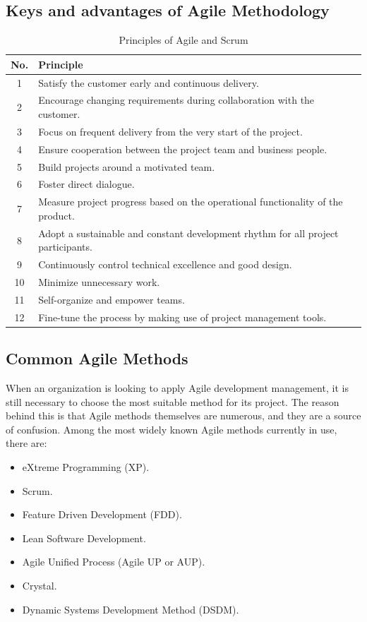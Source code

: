 \subsection{Keys and advantages of Agile Methodology}
\begin{table}[h]
\centering
\begin{tabular}{|c|l|}
\hline
\textbf{No.} & \textbf{Principle} \\ \hline
1  & Satisfy the customer early and continuous delivery. \\ \hline
2  & Encourage changing requirements during collaboration with the customer. \\ \hline
3  & Focus on frequent delivery from the very start of the project. \\ \hline
4  & Ensure cooperation between the project team and business people. \\ \hline
5  & Build projects around a motivated team. \\ \hline
6  & Foster direct dialogue. \\ \hline
7  & Measure project progress based on the operational functionality of the product. \\ \hline
8  & Adopt a sustainable and constant development rhythm for all project participants. \\ \hline
9  & Continuously control technical excellence and good design. \\ \hline
10 & Minimize unnecessary work. \\ \hline
11 & Self-organize and empower teams. \\ \hline
12 & Fine-tune the process by making use of project management tools. \\ \hline
\end{tabular}
\caption{Principles of Agile and Scrum}
\end{table}

\subsection{Common Agile Methods}
When an organization is looking to apply Agile development management, it is still necessary to choose the most suitable method for its project. The reason behind this is that Agile methods themselves are numerous, and they are a source of confusion. Among the most widely known Agile methods currently in use, there are:
\begin{itemize}
    \item eXtreme Programming (XP).
    \item Scrum.
    \item Feature Driven Development (FDD).
    \item Lean Software Development.
    \item Agile Unified Process (Agile UP or AUP).
    \item Crystal.
    \item Dynamic Systems Development Method (DSDM).
\end{itemize} 
